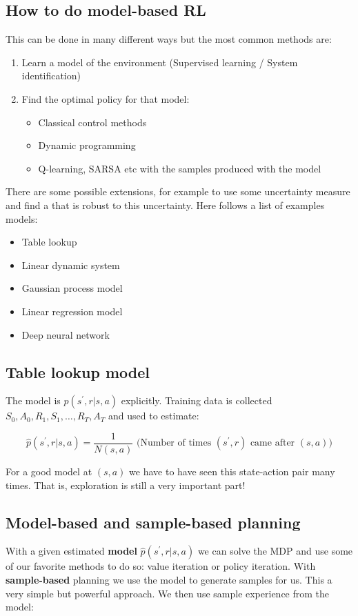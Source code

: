 \subsection*{How to do model-based RL}
This can be done in many different ways but the most common methods are: 

\begin{enumerate}
	\item Learn a model of the environment (Supervised learning / System identification)
	\item Find the optimal policy for that model:
		\begin{itemize}
			\item Classical control  methods
			\item Dynamic programming 
			\item Q-learning, SARSA etc with the samples produced with the model
		\end{itemize}
\end{enumerate}

There are some possible extensions, for example to use some uncertainty measure and find a that is robust to this uncertainty. Here follows a list of examples models:

\begin{itemize}
	\item Table lookup
	\item Linear dynamic system 
	\item Gaussian process model
	\item Linear regression model
	\item Deep neural network
\end{itemize}


\subsection*{Table lookup model}
The model is $p(s^{\prime},r|s,a)$ explicitly. Training data is collected $S_0, A_0, R_1, S_1, \ldots, R_T,A_T$ and used to estimate:

	\begin{equation}
		\hat{p} (s^{\prime},r|s,a) = \frac{1} {N(s,a)} \text{ (Number of times } (s^{\prime},r) \text{ came after } (s,a)) 
	\end{equation}

For a good model at $(s,a)$ we have to have seen this state-action pair many times. That is, exploration is still a very important part!

\subsection*{Model-based and sample-based planning}
With a given estimated \textbf{model} $\hat{p}(s^{\prime},r|s,a)$ we can solve the MDP and use some of our favorite methods to do so: value iteration or policy iteration. With \textbf{sample-based} planning we use the model to generate samples for us. This a very simple but powerful approach. We then use sample experience from the model:

